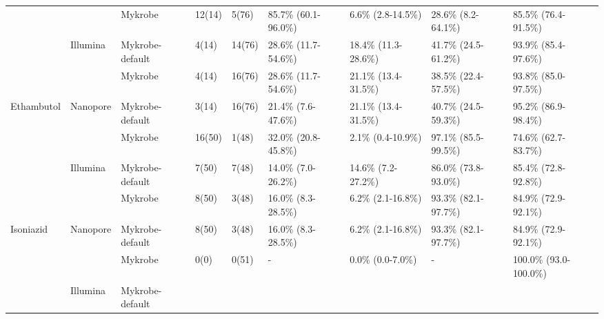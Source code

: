 \begin{table}[]
{\begin{tabular}{|l|l|l|l|l|l|l|l|l|}
 &
   &
  Mykrobe &
  12(14) &
  5(76) &
  85.7\% (60.1-96.0\%) &
  6.6\% (2.8-14.5\%) &
  28.6\% (8.2-64.1\%) &
  85.5\% (76.4-91.5\%) \\ \cline{3-9} 
 &
  \multirow{-2}{*}{Illumina} &
  \cellcolor[HTML]{EFEFEF}Mykrobe-default &
  \cellcolor[HTML]{EFEFEF}4(14) &
  \cellcolor[HTML]{EFEFEF}14(76) &
  \cellcolor[HTML]{EFEFEF}28.6\% (11.7-54.6\%) &
  \cellcolor[HTML]{EFEFEF}18.4\% (11.3-28.6\%) &
  \cellcolor[HTML]{EFEFEF}41.7\% (24.5-61.2\%) &
  \cellcolor[HTML]{EFEFEF}93.9\% (85.4-97.6\%) \\ \cline{2-9} 
 &
   &
  Mykrobe &
  4(14) &
  16(76) &
  28.6\% (11.7-54.6\%) &
  21.1\% (13.4-31.5\%) &
  38.5\% (22.4-57.5\%) &
  93.8\% (85.0-97.5\%) \\ \cline{3-9} 
\multirow{-4}{*}{Ethambutol} &
  \multirow{-2}{*}{Nanopore} &
  \cellcolor[HTML]{EFEFEF}Mykrobe-default &
  \cellcolor[HTML]{EFEFEF}3(14) &
  \cellcolor[HTML]{EFEFEF}16(76) &
  \cellcolor[HTML]{EFEFEF}21.4\% (7.6-47.6\%) &
  \cellcolor[HTML]{EFEFEF}21.1\% (13.4-31.5\%) &
  \cellcolor[HTML]{EFEFEF}40.7\% (24.5-59.3\%) &
  \cellcolor[HTML]{EFEFEF}95.2\% (86.9-98.4\%) \\ \hline
 &
   &
  Mykrobe &
  16(50) &
  1(48) &
  32.0\% (20.8-45.8\%) &
  2.1\% (0.4-10.9\%) &
  97.1\% (85.5-99.5\%) &
  74.6\% (62.7-83.7\%) \\ \cline{3-9} 
 &
  \multirow{-2}{*}{Illumina} &
  \cellcolor[HTML]{EFEFEF}Mykrobe-default &
  \cellcolor[HTML]{EFEFEF}7(50) &
  \cellcolor[HTML]{EFEFEF}7(48) &
  \cellcolor[HTML]{EFEFEF}14.0\% (7.0-26.2\%) &
  \cellcolor[HTML]{EFEFEF}14.6\% (7.2-27.2\%) &
  \cellcolor[HTML]{EFEFEF}86.0\% (73.8-93.0\%) &
  \cellcolor[HTML]{EFEFEF}85.4\% (72.8-92.8\%) \\ \cline{2-9} 
 &
   &
  Mykrobe &
  8(50) &
  3(48) &
  16.0\% (8.3-28.5\%) &
  6.2\% (2.1-16.8\%) &
  93.3\% (82.1-97.7\%) &
  84.9\% (72.9-92.1\%) \\ \cline{3-9} 
\multirow{-4}{*}{Isoniazid} &
  \multirow{-2}{*}{Nanopore} &
  \cellcolor[HTML]{EFEFEF}Mykrobe-default &
  \cellcolor[HTML]{EFEFEF}8(50) &
  \cellcolor[HTML]{EFEFEF}3(48) &
  \cellcolor[HTML]{EFEFEF}16.0\% (8.3-28.5\%) &
  \cellcolor[HTML]{EFEFEF}6.2\% (2.1-16.8\%) &
  \cellcolor[HTML]{EFEFEF}93.3\% (82.1-97.7\%) &
  \cellcolor[HTML]{EFEFEF}84.9\% (72.9-92.1\%) \\ \hline
 &
   &
  Mykrobe &
  0(0) &
  0(51) &
  - &
  0.0\% (0.0-7.0\%) &
  - &
  100.0\% (93.0-100.0\%) \\ \cline{3-9} 
 &
  \multirow{-2}{*}{Illumina} &
  \cellcolor[HTML]{EFEFEF}Mykrobe-default &

\end{tabular}}
\end{table}
